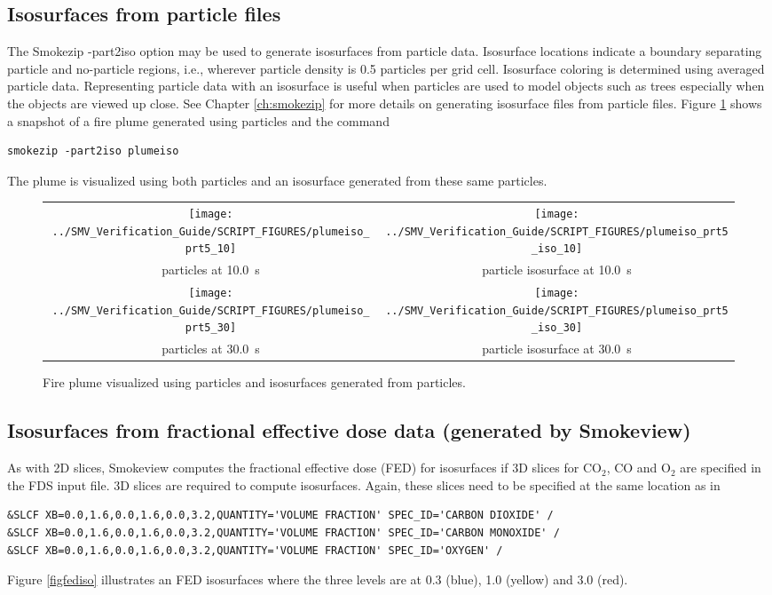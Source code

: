 \documentclass[11pt,twoside]{book}
\begin{document}
\subsection{Isosurfaces from particle files}
The Smokezip -part2iso option may be used to generate isosurfaces from particle data.
Isosurface locations indicate a boundary separating particle and
no-particle regions, i.e., wherever particle density is 0.5
particles per grid cell.  Isosurface  coloring is determined using
averaged particle data.  Representing particle data with an
isosurface is useful when particles are used to model objects such
as trees especially when the objects are viewed up close.  See
Chapter \ref{ch:smokezip} for more details on generating
isosurface files from particle files.  Figure \ref{figisoparticle}
shows a snapshot of a fire plume generated using particles and the command
\begin{lstlisting}
smokezip -part2iso plumeiso
\end{lstlisting}
The plume is visualized using both particles and an isosurface
generated from these same particles.


\begin{figure}[\figoptions]
\begin{center}
\begin{tabular}{cc}
\texttt{[image: ../SMV\_Verification\_Guide/SCRIPT\_FIGURES/plumeiso\_prt5\_10]}&
\texttt{[image: ../SMV\_Verification\_Guide/SCRIPT\_FIGURES/plumeiso\_prt5\_iso\_10]}\\
particles at 10.0~s&particle isosurface at 10.0~s\\
\texttt{[image: ../SMV\_Verification\_Guide/SCRIPT\_FIGURES/plumeiso\_prt5\_30]}&
\texttt{[image: ../SMV\_Verification\_Guide/SCRIPT\_FIGURES/plumeiso\_prt5\_iso\_30]}\\
particles at 30.0~s&particle isosurface at 30.0~s\\
\end{tabular}
\end{center}
\caption{Fire plume visualized using particles and isosurfaces
generated from  particles.}
\label{figisoparticle}%
\end{figure}

\subsection{Isosurfaces from fractional effective dose data (generated by Smokeview)}
As with 2D slices, Smokeview computes the fractional effective dose (FED) for isosurfaces
if 3D slices for $\mathrm{CO_2}$, CO and $\mathrm{O_2}$ are
specified in the FDS input file.  3D slices are required to compute isosurfaces.
Again, these slices need to be specified at the
same location as in
\begin{lstlisting}
&SLCF XB=0.0,1.6,0.0,1.6,0.0,3.2,QUANTITY='VOLUME FRACTION' SPEC_ID='CARBON DIOXIDE' /
&SLCF XB=0.0,1.6,0.0,1.6,0.0,3.2,QUANTITY='VOLUME FRACTION' SPEC_ID='CARBON MONOXIDE' /
&SLCF XB=0.0,1.6,0.0,1.6,0.0,3.2,QUANTITY='VOLUME FRACTION' SPEC_ID='OXYGEN' /
\end{lstlisting}
Figure \ref{figfediso} illustrates
an FED isosurfaces where the three levels are at 0.3 (blue), 1.0 (yellow) and 3.0 (red).
\end{document}
